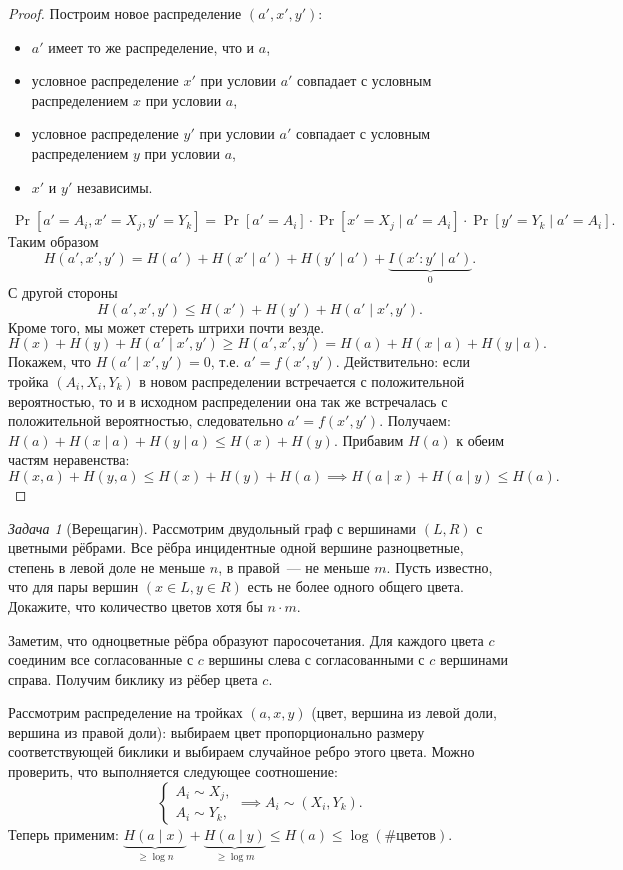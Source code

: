 \documentclass[12pt]{article}
\theoremstyle{definition}
\theoremstyle{plain}
\theoremstyle{remark}
\newtheorem{problem}{Задача}[section]
\begin{document}
\begin{proof}
    Построим новое распределение $(a',x',y')$:
    \begin{itemize}
        \item $a'$ имеет то же распределение, что и $a$,
        \item условное распределение $x'$ при условии $a'$ совпадает
            с условным распределением $x$ при условии $a$,
        \item условное распределение $y'$ при условии $a'$ совпадает
            с условным распределением $y$ при условии $a$,
        \item $x'$ и $y'$ независимы.
    \end{itemize}
    \[\
    \Pr[a'=A_i, x' = X_j, y' = Y_k] = 
    \Pr[a'=A_i]\cdot \Pr[x' = X_j\mid a'=A_i]\cdot \Pr[y' = Y_k\mid a' = A_i].
    \]
    Таким образом
    \[
        H(a',x',y') = H(a') + H(x'\mid a') + H(y'\mid a') + \underbrace{I(x':y'\mid a')}_{0}.
    \]
    С другой стороны
    \[
        H(a',x',y') \le H(x') + H(y') + H(a'\mid x',y').
    \]
    Кроме того, мы может стереть штрихи почти везде.
    \[
        H(x) + H(y) + H(a'\mid x',y') \ge H(a',x',y') = H(a) + H(x\mid a) + H(y\mid a).
    \]
    Покажем, что $H(a'\mid x', y') = 0$, т.е. $a' = f(x',y')$. Действительно: 
    если тройка $(A_i, X_i, Y_k)$ в новом распределении встречается с положительной
    вероятностью, то и в исходном распределении она так же встречалась с положительной
    вероятностью, следовательно $a' = f(x',y')$.
    Получаем: $H(a) + H(x\mid a) + H(y\mid a) \le H(x) + H(y)$. Прибавим $H(a)$ к обеим частям
    неравенства:
    \[
       H(x,a) + H(y,a) \le H(x) + H(y) + H(a)\implies H(a\mid x) + H(a \mid y) \le H(a).
    \]
\end{proof}
\begin{problem}[Верещагин]
    Рассмотрим двудольный граф с вершинами $(L,R)$ с цветными рёбрами.
    Все рёбра инцидентные одной вершине разноцветные, степень в левой доле не меньше $n$, 
    в правой~--- не меньше $m$. Пусть известно, что для пары вершин $(x\in L, y\in R)$
    есть не более одного общего цвета. Докажите, что количество цветов хотя бы $n\cdot m$.

    Заметим, что одноцветные рёбра образуют паросочетания. Для каждого цвета $c$ соединим все
    согласованные с $c$ вершины слева с согласованными с $c$ вершинами справа. Получим биклику из
    рёбер цвета $c$.

    Рассмотрим распределение на тройках $(a,x,y)$ (цвет, вершина из левой доли, вершина из правой
    доли): выбираем цвет пропорционально размеру соответствующей биклики и выбираем случайное ребро
    этого цвета. Можно проверить, что выполняется следующее соотношение:
\[
    \begin{cases}
        A_i \sim X_j,\\
        A_i \sim Y_k,
    \end{cases} \implies A_i\sim(X_i,Y_k).
\]
Теперь применим: $\underbrace{H(a\mid x)}_{\ge\log n} + 
                  \underbrace{H(a\mid y)}_{\ge\log m} \le H(a) \le \log (\text{\# цветов})$.
\end{problem}
\end{document}
